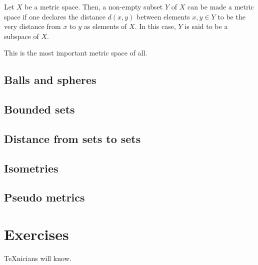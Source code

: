 \begin{example}[Subspaces]\label{example:subspaces}
  Let \(X\) be a metric space. Then, a non-empty subset \(Y\) of \(X\) can be
  made a metric space if one declares the distance \(d(x,y)\) between elements
  \(x,y\in{Y}\) to be the very distance from \(x\) to \(y\) as elements of
  \(X\). In this case, \(Y\) is said to be a subspace of \(X\).
\end{example}

\begin{example}\label{example:the-real-line}
  This is the most important metric space of all.
\end{example}


\subsection{Balls and spheres}

\subsection{Bounded sets}

\subsection{Distance from sets to sets}

\subsection{Isometries}

\subsection{Pseudo metrics}

\section{Exercises}

\begin{exercise}
  \TeX{}nicians will know.
\end{exercise}
